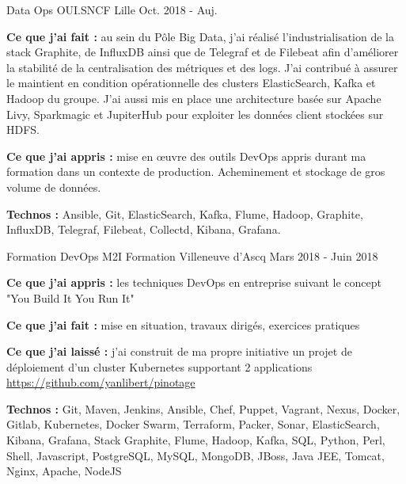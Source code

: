

\begin{cventries}

  \cventry
    {Data Ops} %
    {OUI.SNCF} %
    {Lille} %
    {Oct. 2018 - Auj.} %
    {
      \begin{cvitems} %
        \item {\textbf{Ce que j'ai fait :} au sein du Pôle Big Data, j'ai réalisé l'industrialisation de la stack Graphite, de InfluxDB ainsi que de Telegraf et de Filebeat afin d'améliorer la stabilité de la centralisation des métriques et des logs. J'ai contribué à assurer le maintient en condition opérationnelle des clusters ElasticSearch, Kafka et Hadoop du groupe. J'ai aussi mis en place une architecture basée sur Apache Livy, Sparkmagic et JupiterHub pour exploiter les données client stockées sur HDFS.}
        \item {\textbf{Ce que j'ai appris :} mise en \oe uvre des outils DevOps appris durant ma formation dans un contexte de production. Acheminement et stockage de gros volume de données.}
        \item {\textbf{Technos :} Ansible, Git, ElasticSearch, Kafka, Flume, Hadoop, Graphite, InfluxDB, Telegraf, Filebeat, Collectd, Kibana, Grafana.}
      \end{cvitems}
    }

  \cventry
    {Formation DevOps} %
    {M2I Formation} %
    {Villeneuve d'Ascq} %
    {Mars 2018 - Juin 2018} %
    {
      \begin{cvitems} %
        \item {\textbf{Ce que j'ai appris :} les techniques DevOps en entreprise suivant le concept "You Build It You Run It"}
        \item {\textbf{Ce que j'ai fait :} mise en situation, travaux dirigés, exercices pratiques}
        \item {\textbf{Ce que j'ai laissé :} j'ai construit de ma propre initiative un projet de déploiement d'un cluster Kubernetes supportant 2 applications \url{https://github.com/yanlibert/pinotage} }
        \item {\textbf{Technos :} Git, Maven, Jenkins, Ansible, Chef, Puppet, Vagrant, Nexus, Docker, Gitlab, Kubernetes, Docker Swarm, Terraform, Packer, Sonar, ElasticSearch, Kibana, Grafana, Stack Graphite, Flume, Hadoop, Kafka, SQL, Python, Perl, Shell, Javascript, PostgreSQL, MySQL, MongoDB, JBoss, Java JEE, Tomcat, Nginx, Apache, NodeJS}
      \end{cvitems}
    }


\end{cventries}
